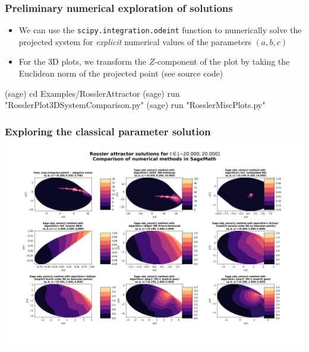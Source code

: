 \documentclass[usenames,svgnames,dvipsnames,10pt]{beamer}
\begin{document}
\begin{frame}[fragile]
\frametitle{Preliminary numerical exploration of solutions}

\begin{itemize} 

\item We can use the \texttt{scipy.integration.odeint} function to numerically solve the projected system 
      for \emph{explicit} numerical values of the parameters $(a, b, c)$ 
\item For the 3D plots, we transform the $Z$-component of the plot by taking the Euclidean norm of the projected point (see source code)

\end{itemize} 

\begin{center}
\begin{code}
(sage) cd Examples/RosslerAttractor
(sage) run "RosslerPlot3DSystemComparison.py"
(sage) run "RosslerMiscPlots.py"
\end{code}
\end{center}

\end{frame}

\begin{frame}[fragile]
\frametitle{Exploring the classical parameter solution}

\begin{center}
\vskip -0.5cm
\includegraphics[height=0.92\textheight]{../Images/RosslerAttractorSage3DSolvers-2021-10-29-073902.png}
\end{center}

\end{frame}
\end{document}
